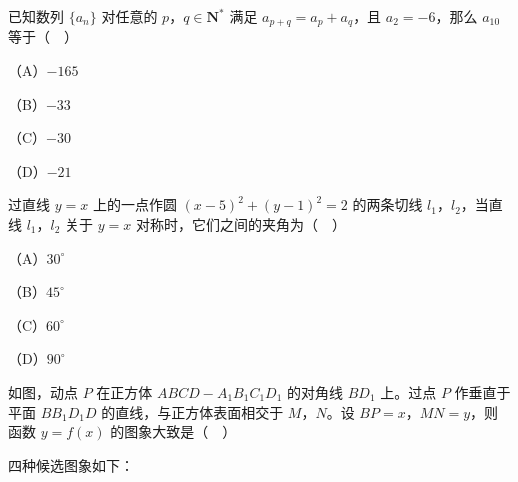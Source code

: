 \begin{question}
已知数列 $\{a_n\}$ 对任意的 $p$，$q\in\mathbf N^*$ 满足 $a_{p+q}=a_p+a_q$，且 $a_2=-6$，那么 $a_{10}$ 等于（　）

（A）$-165$

（B）$-33$

（C）$-30$

（D）$-21$

\end{question}
\begingroup
\renewenvironment{question}{\Needspace{0.46\textheight}}{}
\begin{question}
过直线 $y=x$ 上的一点作圆 $(x-5)^2+(y-1)^2=2$ 的两条切线 $l_1$，$l_2$，当直线 $l_1$，$l_2$ 关于 $y=x$ 对称时，它们之间的夹角为（　）

（A）$30^\circ$

（B）$45^\circ$

（C）$60^\circ$

（D）$90^\circ$

\Needspace{0.4\textheight}
\end{question}
\endgroup
\begin{question}
如图，动点 $P$ 在正方体 $ABCD-A_1B_1C_1D_1$ 的对角线 $BD_1$ 上。过点 $P$ 作垂直于平面 $BB_1D_1D$ 的直线，与正方体表面相交于 $M$，$N$。设 $BP=x$，$MN=y$，则函数 $y=f(x)$ 的图象大致是（　）
\nopagebreak[4]
\begin{center}\end{center}
\nopagebreak[4]
四种候选图象如下：
\nopagebreak[4]
\begin{center}\end{center}
\nopagebreak[4]
\end{question}

